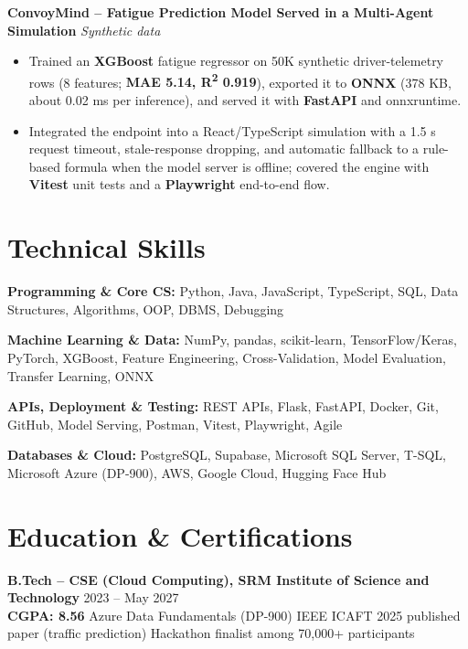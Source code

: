 \documentclass[11pt]{extarticle}
\begin{document}
\vspace{3pt}

\textbf{ConvoyMind -- Fatigue Prediction Model Served in a Multi-Agent Simulation}
\hfill \textit{Synthetic data}

\begin{itemize}
    \item Trained an \textbf{XGBoost} fatigue regressor on 50K synthetic driver-telemetry rows (8 features; \textbf{MAE 5.14, R\textsuperscript{2} 0.919}), exported it to \textbf{ONNX} (378 KB, about 0.02 ms per inference), and served it with \textbf{FastAPI} and onnxruntime.
    \item Integrated the endpoint into a React/TypeScript simulation with a 1.5 s request timeout, stale-response dropping, and automatic fallback to a rule-based formula when the model server is offline; covered the engine with \textbf{Vitest} unit tests and a \textbf{Playwright} end-to-end flow.
\end{itemize}


\section*{Technical Skills}

{\small

\textbf{Programming \& Core CS:} Python, Java, JavaScript, TypeScript, SQL, Data Structures, Algorithms, OOP, DBMS, Debugging

\textbf{Machine Learning \& Data:} NumPy, pandas, scikit-learn, TensorFlow/Keras, PyTorch, XGBoost, Feature Engineering, Cross-Validation, Model Evaluation, Transfer Learning, ONNX

\textbf{APIs, Deployment \& Testing:} REST APIs, Flask, FastAPI, Docker, Git, GitHub, Model Serving, Postman, Vitest, Playwright, Agile

\textbf{Databases \& Cloud:} PostgreSQL, Supabase, Microsoft SQL Server, T-SQL, Microsoft Azure (DP-900), AWS, Google Cloud, Hugging Face Hub

}


\section*{Education \& Certifications}

\textbf{B.Tech -- CSE (Cloud Computing), SRM Institute of Science and Technology}
\hfill 2023 -- May 2027 \\
\textbf{CGPA: 8.56} \quad\textbar\quad
Azure Data Fundamentals (DP-900) \quad\textbar\quad
IEEE ICAFT 2025 published paper (traffic prediction) \quad\textbar\quad
Hackathon finalist among 70,000+ participants
\end{document}
